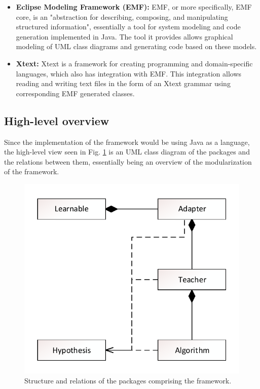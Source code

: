 \begin{itemize}
	\item \textbf{Eclipse Modeling Framework (EMF):} EMF, or more specifically, EMF core, is an "abstraction for describing, composing, and manipulating structured information", essentially a tool for system modeling and code generation implemented in Java. The tool it provides allows graphical modeling of UML class diagrams and generating code based on these models.
	\item \textbf{Xtext:} Xtext is a framework for creating programming and domain-specific languages, which also has integration with EMF. This integration allows reading and writing text files in the form of an Xtext grammar using corresponding EMF generated classes.
\end{itemize}


\subsection{High-level overview}

Since the implementation of the framework would be using Java as a language, the high-level view seen in Fig. \ref{fig:abstractoverview} is an UML class diagram of the packages and the relations between them, essentially being an overview of the modularization of the framework.

\begin{figure}[H]
	\centering
	\includegraphics[width=0.5\linewidth]{figures/abstractoverview}
	\caption{Structure and relations of the packages comprising the framework.}
	\label{fig:abstractoverview}
\end{figure}

